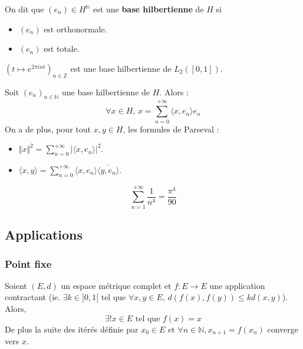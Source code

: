 	\begin{definition}
		On dit que $(e_n) \in H^{\mathbb{N}}$ est une \textbf{base hilbertienne} de $H$ si
		\begin{itemize}
			\item $(e_n)$ est orthonormale.
			\item $(e_n)$ est totale.
		\end{itemize}
	\end{definition}

	\begin{example}
		$(t \mapsto e^{2\pi int})_{n \in \mathbb{Z}}$ est une base hilbertienne de $L_2([0,1])$.
	\end{example}

	\begin{theorem}
		Soit $(e_n)_{n \in \mathbb{N}}$ une base hilbertienne de $H$. Alors :
		\[ \forall x \in H, \, x = \sum_{n=0}^{+\infty} \langle x, e_n \rangle e_n \]
		On a de plus, pour tout $x, y \in H$, les formules de Parseval :
		\begin{itemize}
			\item $\Vert x \Vert^2 = \sum_{n=0}^{+\infty} \vert \langle x, e_n \rangle \vert^2$.
			\item $\langle x, y \rangle = \sum_{n=0}^{+\infty} \langle x, e_n \rangle \overline{\langle y, e_n \rangle}$.
		\end{itemize}
	\end{theorem}


	\begin{application}
		\[ \sum_{n = 1}^{+\infty} \frac{1}{n^4} = \frac{\pi^4}{90} \]
	\end{application}

	\subsection{Applications}

	\subsubsection{Point fixe}


	\begin{theorem}
		Soient $(E,d)$ un espace métrique complet et $f : E \rightarrow E$ une application contractant (ie. $\exists k \in ]0,1[ \text{ tel que } \forall x, y \in E, \, d(f(x), f(y)) \leq k d(x, y)$). Alors,
		\[ \exists! x \in E \text{ tel que } f(x) = x \]
		De plus la suite des itérés définie par $x_0 \in E$ et $\forall n \in \mathbb{N}, x_{n+1} = f(x_n)$ converge vers $x$.
	\end{theorem}

